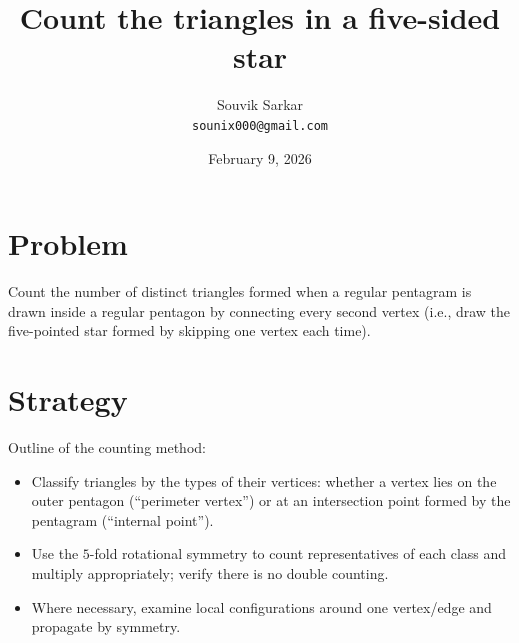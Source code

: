 \documentclass[11pt]{article}
\title{Count the triangles in a five-sided star}
\author{Souvik Sarkar \\ \texttt{sounix000@gmail.com}}
\date{February 9, 2026}
\begin{document}
\maketitle

\section*{Problem}
Count the number of distinct triangles formed when a regular pentagram is drawn inside a regular pentagon by connecting every second vertex (i.e., draw the five-pointed star formed by skipping one vertex each time).

\begin{center}
  \vspace{0.5em}
  \vspace{0.5em}
\end{center}

\section*{Strategy}
Outline of the counting method:

\begin{itemize}
  \item Classify triangles by the types of their vertices: whether a vertex lies on the outer pentagon (``perimeter vertex'') or at an intersection point formed by the pentagram (``internal point'').
  \item Use the $5$-fold rotational symmetry to count representatives of each class and multiply appropriately; verify there is no double counting.
  \item Where necessary, examine local configurations around one vertex/edge and propagate by symmetry.
\end{itemize}
\end{document}
